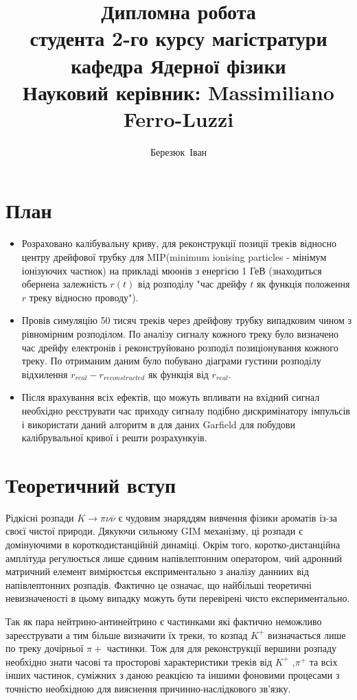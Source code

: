 \documentclass[]{article}
\author{Березюк~Іван}
\title{ Дипломна робота \\ 
		студента 2-го курсу магістратури \\
		кафедра Ядерної фізики\\
		Науковий керівник: Massimiliano Ferro-Luzzi\\ 
		}
\begin{document}
	 \linenumbers
	\maketitle
	\newpage
	\section{ План}
	\begin{itemize}
		\item Розраховано калібувальну криву, для реконструкції позиції треків відносно центру дрейфової трубку для MIP(minimum ionising particles - мінімум іонізуючих частнок) на прикладі мюонів з енергією 1 ГеВ (знаходиться обернена залежність $r(t)$ від розподілу "час дрейфу $t$ як функція положення $r$ треку відносно проводу").\par
		\item Провів симуляцію 50 тисяч треків через дрейфову трубку випадковим чином з рівномірним розподілом. По аналізу сигналу кожного треку було визначено час дрейфу електронів і реконструйовано розподіл позиціонування кожного треку. По отриманим даним було побувано діаграми густини розподілу відхилення $r_{real} - r_{reconstructed}$ як функція від $r_{real}$.
	
		\item Після врахування всіх ефектів, що можуть впливати на вхідний сигнал необхідно реєструвати час приходу сигналу подібно дискримінатору імпульсів і використати даний алгоритм в для даних Garfield для побудови калібрувальної кривої і решти розрахункуів.
	\end{itemize}

	\newpage
	\section{Теоретичний вступ}
		Рідкісні розпади $ K \rightarrow \pi\nu \overline{\nu} $ є чудовим знаряддям вивчення фізики ароматів із-за своєї чистої природи. Дякуючи сильному GIM механізму, ці розпади є домінуючими в короткодистанційній динаміці. Окрім того, коротко-дистанційна амплітуда регулюється лише єдиним напівлептонним оператором, чий адронний матричний елемент вимірюєтсья експриментально з аналізу данниих від напівлептонних розпадів. Фактично це означає, що найбільші теоретичні невизначеності в цьому випадку можуть бути перевірені чисто експериментально.
		
		Так як пара нейтрино-антинейтрино є частинками які фактично неможливо зареєструвати а тим більше визначити їх треки, то козпад $K^+$ визначається лише по треку дочірньої $\pi+$ частинки. Тож для для реконструкції вершини розпаду необхідно знати часові та просторові характеристики треків від $K^+$ ,$\pi^+$ та всіх інших частинок, суміжних з даною реакцією та іншими фоновими процесами з точністю необхідною для вияснення причинно-наслідкового зв’язку.
		
\end{document}
